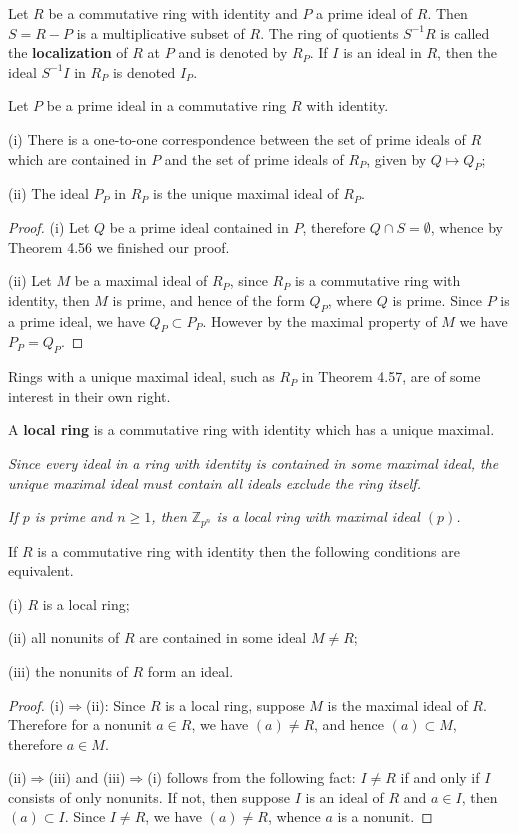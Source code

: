 Let $R$ be a commutative ring with identity and $P$ a prime ideal of $R$. Then $S=R-P$ is a multiplicative subset of $R$. The ring of quotients $S^{-1}R$ is called the \textbf{localization} of $R$ at $P$ and is denoted by $R_P$. If $I$ is an ideal in $R$, then the ideal $S^{-1}I$ in $R_P$ is denoted $I_P$.
\begin{theorem}
Let $P$ be a prime ideal in a commutative ring $R$ with identity.\par
(i) There is a one-to-one correspondence between the set of prime ideals of $R$ which are contained in $P$ and the set of prime ideals of $R_P$, given by $Q\mapsto Q_P$;\par
(ii) The ideal $P_P$ in $R_P$ is the unique maximal ideal of $R_P$.
\end{theorem}
\begin{proof}
(i) Let $Q$ be a prime ideal contained in $P$, therefore $Q\cap S=\emptyset$, whence by Theorem 4.56 we finished our proof.\par
(ii) Let $M$ be a maximal ideal of $R_P$, since $R_P$ is a commutative ring with identity, then $M$ is prime, and hence of the form $Q_P$, where $Q$ is prime. Since $P$ is a prime ideal, we have $Q_P\subset P_P$. However by the maximal property of $M$ we have $P_P=Q_P$.
\end{proof}
Rings with a unique maximal ideal, such as $R_P$ in Theorem 4.57, are of some interest in their own right.
\begin{definition}
A \textbf{local ring} is a commutative ring with identity which has a unique maximal.
\end{definition}
\begin{note}\em
Since every ideal in a ring with identity is contained in some maximal ideal, the unique maximal ideal must contain all ideals exclude the ring itself.
\end{note}
\begin{example}\em
If $p$ is prime and $n\ge 1$, then $\mathbb{Z}_{p^n}$ is a local ring with maximal ideal $(p)$.
\end{example}
\begin{theorem}
If $R$ is a commutative ring with identity then the following conditions are equivalent.\par
(i) $R$ is a local ring;\par
(ii) all nonunits of $R$ are contained in some ideal $M\ne R$;\par
(iii) the nonunits of $R$ form an ideal.
\end{theorem}
\begin{proof}
(i)$\Rightarrow$(ii): Since $R$ is a local ring, suppose $M$ is the maximal ideal of $R$. Therefore for a nonunit $a\in R$, we have $(a)\ne R$, and hence $(a)\subset M$, therefore $a\in M$.\par
(ii)$\Rightarrow$(iii) and (iii)$\Rightarrow$(i) follows from the following fact: $I\ne R$ if and only if $I$ consists of only nonunits. If not, then suppose $I$ is an ideal of $R$ and $a\in I$, then $(a)\subset I$. Since $I\ne R$, we have $(a)\ne R$, whence $a$ is a nonunit.
\end{proof}
